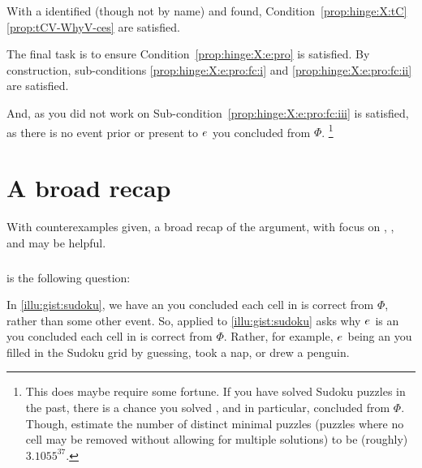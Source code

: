 \begin{note}
  With a \torNa{} identified (though not by name) and \tpro{} found, Condition~\ref{prop:hinge:X:tC} \autoref{prop:tCV-WhyV-ces} are satisfied.

  The final task is to ensure Condition~\ref{prop:hinge:X:e:pro} is satisfied.
  By construction, sub-conditions \ref{prop:hinge:X:e:pro:fc:i} and \ref{prop:hinge:X:e:pro:fc:ii} are satisfied.

  And, as you did not work on \sudokuPuzR{} Sub-condition~\ref{prop:hinge:X:e:pro:fc:iii} is satisfied, as there is no event prior or present to \(e\sb{}\) \inwhich{} you concluded \sudokuRPV{} from \(\Phi\).%
  \footnote{
    This does maybe require some fortune.
    If you have solved Sudoku puzzles in the past, there is a chance you solved \sudokuPuzR{}, and in particular, concluded \sudokuRPV{} from \(\Phi\).
    Though, \citeauthor{Berthier:2010aa} estimate the number of distinct minimal puzzles (puzzles where no cell may be removed without allowing for multiple solutions) to be (roughly) \(3.1055^{37}\).
  }
\end{note}



\section{A broad recap}


\begin{note}
  With counterexamples given, a broad recap of the argument, with focus on \qWhy{}, \qHow{}, and \issueInclusion{} may be helpful.
\end{note}


\subparagraph*{\qWhy{}}


\begin{note}
  \qWhy{} is the following question:

\end{note}


\begin{note}
  In \autoref{illu:gist:sudoku}, we have an  you concluded each cell in \sudokuPuzL{} is correct from \(\Phi\), rather than some other event.
  So, \qWhy{} applied to \autoref{illu:gist:sudoku} asks why \(e\sb{}\) is an  you concluded each cell in \sudokuPuzL{} is correct from \(\Phi\).
  Rather, for example, \(e\sb{}\) being an  you filled in the Sudoku grid by guessing, took a nap, or drew a penguin.
\end{note}


